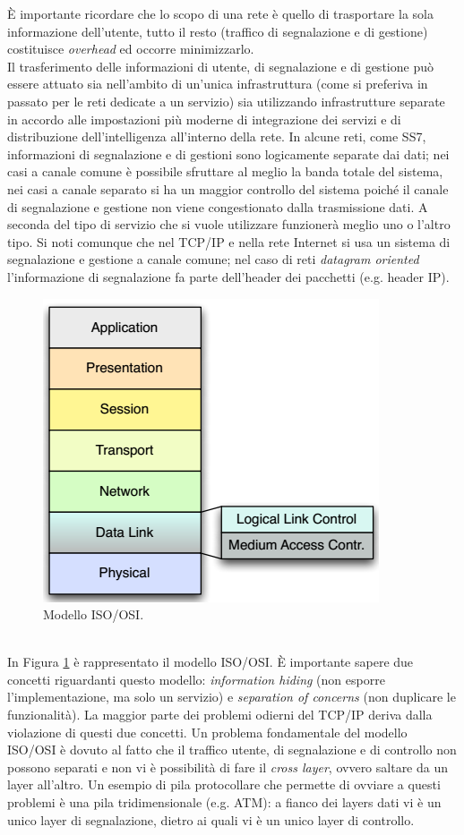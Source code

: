 È importante ricordare che lo scopo di una rete è quello di trasportare la sola informazione dell'utente, tutto il resto (traffico di segnalazione e di gestione) costituisce \textit{overhead} ed occorre minimizzarlo.\\
Il trasferimento delle informazioni di utente, di segnalazione e di gestione può essere attuato sia nell'ambito di un'unica infrastruttura (come si preferiva in passato per le reti dedicate a un servizio) sia utilizzando infrastrutture separate in accordo alle impostazioni più moderne di integrazione dei servizi e di distribuzione dell'intelligenza all'interno della rete. In alcune reti, come SS7, informazioni di segnalazione e di gestioni sono logicamente separate dai dati; nei casi a canale comune è possibile sfruttare al meglio la banda totale del sistema, nei casi a canale separato si ha un maggior controllo del sistema poiché il canale di segnalazione e gestione non viene congestionato dalla trasmissione dati. A seconda del tipo di servizio che si vuole utilizzare funzionerà meglio uno o l'altro tipo. Si noti comunque che nel TCP/IP e nella rete Internet si usa un sistema di segnalazione e gestione a canale comune; nel caso di reti \textit{datagram oriented} l'informazione di segnalazione fa parte dell'header dei pacchetti (e.g. header IP).
\begin{figure}[htbp]
	\centering
	\includegraphics[scale = 0.55]{images/ISO-OSI}
	\caption{Modello ISO/OSI.}
	\label{img:ISO-OSI}
\end{figure}\\
In Figura \ref{img:ISO-OSI} è rappresentato il modello ISO/OSI. È importante sapere due concetti riguardanti questo modello: \textit{information hiding} (non esporre l'implementazione, ma solo un servizio) e \textit{separation of concerns} (non duplicare le funzionalità). La maggior parte dei problemi odierni del TCP/IP deriva dalla violazione di questi due concetti. Un problema fondamentale del modello ISO/OSI è dovuto al fatto che il traffico utente, di segnalazione e di controllo non possono separati e non vi è possibilità di fare il \textit{cross layer}, ovvero saltare da un layer all'altro. Un esempio di pila protocollare che permette di ovviare a questi problemi è una pila tridimensionale (e.g. ATM): a fianco dei layers dati vi è un unico layer di segnalazione, dietro ai quali vi è un unico layer di controllo.\\
